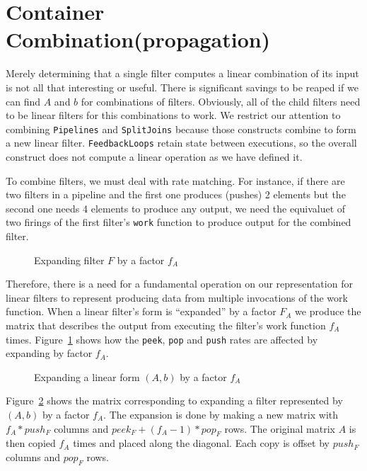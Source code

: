 \section{Container Combination(propagation)}
Merely determining that a single filter computes a linear combination of its input is not
all that interesting or useful. There is significant savings to be reaped if we can
find $A$ and $b$ for combinations of filters. Obviously, all of the child filters need
to be linear filters for this combinations to work. We restrict our attention to combining
{\tt Pipelines} and {\tt SplitJoins} because those constructs combine to form a new linear filter. 
{\tt FeedbackLoops} retain state between executions, so the overall construct 
does not compute a linear operation as we have defined it. 

To combine filters, we must deal with rate matching. For instance, if there are two
filters in a pipeline and the first one produces (pushes) 2 elements but the second one
needs 4 elements to produce any output, we need the equivaluet of two firings of the
first filter's {\tt work} function to produce output for the combined filter. 

\begin{figure}
\center
\epsfxsize=3.0in
\caption{Expanding filter $F$ by a factor $f_{A}$}
\label{fig:expanding-a-filter}
\end{figure}


Therefore, there is a need for a fundamental operation on our representation for 
linear filters to represent producing data from multiple invocations of the work
function. When a linear filter's form is ``expanded'' by a factor $F_{A}$ 
we produce the matrix that describes the output from executing the filter's work
function $f_{A}$ times. Figure~\ref{fig:expanding-a-filter} shows how the {\tt peek},
{\tt pop} and  {\tt push} rates are affected by expanding by factor $f_{A}$.

\begin{figure}
\center
\epsfxsize=3.0in
\caption{Expanding a linear form $(A,b)$ by a factor $f_{A}$}
\label{fig:expanding-a-matrix}
\end{figure}

Figure~\ref{fig:expanding-a-matrix} shows the matrix corresponding to expanding 
a filter represented by $(A,b)$ by a factor $f_{A}$. The expansion is done by 
making a new matrix with $f_{A}*push_{F}$ columns and $peek_{F}+(f_{A}-1)*pop_{F}$
rows. The original matrix $A$ is then copied $f_{A}$ times and placed along the
diagonal. Each copy is offset by $push_{F}$ columns and $pop_{F}$ rows.


